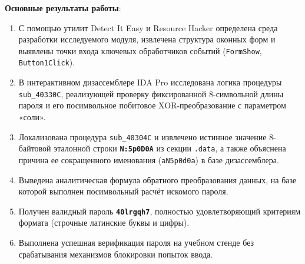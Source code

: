 \documentclass[a4paper]{article}
\begin{document}
\textbf{Основные результаты работы}:
\begin{enumerate}
  \item С помощью утилит Detect It Easy и Resource Hacker определена среда разработки исследуемого модуля, извлечена структура оконных форм и выявлены точки входа ключевых обработчиков событий (\texttt{FormShow}, \texttt{Button1Click}).
  \item В интерактивном дизассемблере IDA Pro исследована логика процедуры \texttt{sub\_40330C}, реализующей проверку фиксированной 8-символьной длины пароля и его посимвольное побитовое XOR-преобразование с параметром «соли».
  \item Локализована процедура \texttt{sub\_40304C} и извлечено истинное значение 8-байтовой эталонной строки \textbf{\texttt{N:5p0D0A}} из секции \texttt{.data}, а также объяснена причина ее сокращенного именования (\texttt{aN5p0d0a}) в базе дизассемблера.
  \item Выведена аналитическая формула обратного преобразования данных, на базе которой выполнен посимвольный расчёт искомого пароля.
  \item Получен валидный пароль \textbf{\texttt{40lrgqh7}}, полностью удовлетворяющий критериям формата (строчные латинские буквы и цифры).
  \item Выполнена успешная верификация пароля на учебном стенде без срабатывания механизмов блокировки попыток ввода.
\end{enumerate}
\end{document}
